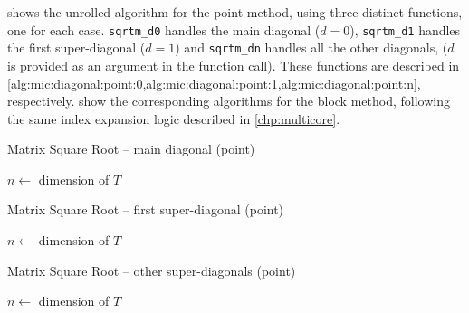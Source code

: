 \documentclass[../thesis]{subfiles}
\begin{document}
		 shows the unrolled algorithm for the point method, using three distinct functions, one for each case. \texttt{sqrtm\_d0} handles the main diagonal ($d = 0$), \texttt{sqrtm\_d1} handles the first super-diagonal ($d = 1$) and \texttt{sqrtm\_dn} handles all the other diagonals, ($d$ is provided as an argument in the function call). These functions are described in \cref{alg:mic:diagonal:point:0,alg:mic:diagonal:point:1,alg:mic:diagonal:point:n}, respectively.  show the corresponding algorithms for the block method, following the same index expansion logic described in \cref{chp:multicore}.

		\begin{algorithm}[htp]
			\caption{Matrix Square Root -- main diagonal (point)}
			\label{alg:mic:diagonal:point:0}
			\DontPrintSemicolon


			$n \leftarrow$ dimension of $T$\;

		\end{algorithm}

		\begin{algorithm}[htp]
			\caption{Matrix Square Root -- first super-diagonal (point)}
			\label{alg:mic:diagonal:point:1}
			\DontPrintSemicolon


			$n \leftarrow$ dimension of $T$\;

		\end{algorithm}

		\begin{algorithm}[htp]
			\caption{Matrix Square Root -- other super-diagonals (point)}
			\label{alg:mic:diagonal:point:n}
			\DontPrintSemicolon


			$n \leftarrow$ dimension of $T$\;

		\end{algorithm}
\end{document}
